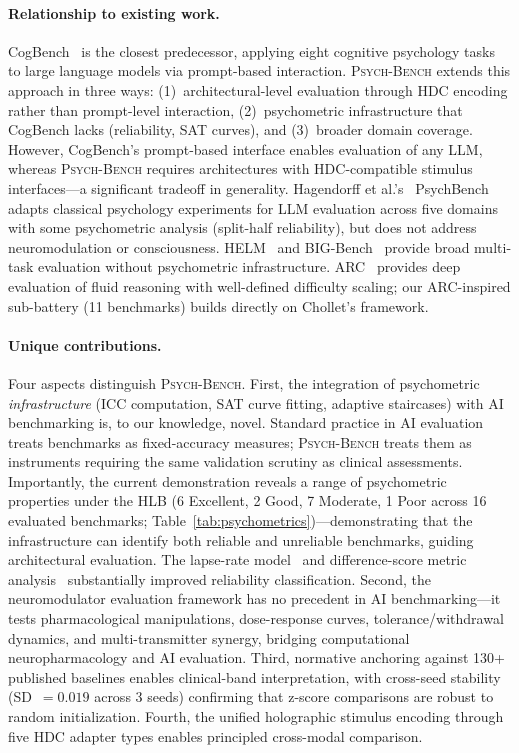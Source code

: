 \documentclass[11pt,letterpaper]{article}
\newcommand{\psychbench}{\textsc{Psych-Bench}}
\newcommand{\hlb}{\textsc{HLB}}
\begin{document}
\paragraph{Relationship to existing work.} CogBench~\citep{codaforno2024cogbench} is the closest predecessor, applying eight cognitive psychology tasks to large language models via prompt-based interaction. \psychbench{} extends this approach in three ways: (1)~architectural-level evaluation through HDC encoding rather than prompt-level interaction, (2)~psychometric infrastructure that CogBench lacks (reliability, SAT curves), and (3)~broader domain coverage. However, CogBench's prompt-based interface enables evaluation of any LLM, whereas \psychbench{} requires architectures with HDC-compatible stimulus interfaces---a significant tradeoff in generality. Hagendorff et al.'s~\citep{hagendorff2023machine} PsychBench adapts classical psychology experiments for LLM evaluation across five domains with some psychometric analysis (split-half reliability), but does not address neuromodulation or consciousness. HELM~\citep{liang2023holistic} and BIG-Bench~\citep{srivastava2023beyond} provide broad multi-task evaluation without psychometric infrastructure. ARC~\citep{chollet2019measure} provides deep evaluation of fluid reasoning with well-defined difficulty scaling; our ARC-inspired sub-battery (11 benchmarks) builds directly on Chollet's framework.

\paragraph{Unique contributions.} Four aspects distinguish \psychbench{}. First, the integration of psychometric \emph{infrastructure} (ICC computation, SAT curve fitting, adaptive staircases) with AI benchmarking is, to our knowledge, novel. Standard practice in AI evaluation treats benchmarks as fixed-accuracy measures; \psychbench{} treats them as instruments requiring the same validation scrutiny as clinical assessments. Importantly, the current demonstration reveals a range of psychometric properties under the \hlb{} (6 Excellent, 2 Good, 7 Moderate, 1 Poor across 16 evaluated benchmarks; Table~\ref{tab:psychometrics})---demonstrating that the infrastructure can identify both reliable and unreliable benchmarks, guiding architectural evaluation. The lapse-rate model~\citep{wichmann2001psychometric} and difference-score metric analysis~\citep{cronbach1970essentials} substantially improved reliability classification. Second, the neuromodulator evaluation framework has no precedent in AI benchmarking---it tests pharmacological manipulations, dose-response curves, tolerance/withdrawal dynamics, and multi-transmitter synergy, bridging computational neuropharmacology and AI evaluation. Third, normative anchoring against 130+ published baselines enables clinical-band interpretation, with cross-seed stability (SD~$= 0.019$ across 3 seeds) confirming that z-score comparisons are robust to random initialization. Fourth, the unified holographic stimulus encoding through five HDC adapter types enables principled cross-modal comparison.
\end{document}
